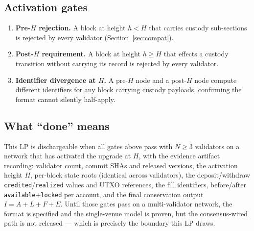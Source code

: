 \subsection{Activation gates}

\begin{enumerate}[leftmargin=2em,nosep]
\item \textbf{Pre-$H$ rejection.} A block at height $h < H$ that carries
  custody sub-sections is rejected by every validator
  (Section~\ref{sec:compat}).
\item \textbf{Post-$H$ requirement.} A block at height $h \ge H$ that
  effects a custody transition without carrying its record is rejected
  by every validator.
\item \textbf{Identifier divergence at $H$.} A pre-$H$ node and a
  post-$H$ node compute different identifiers for any block carrying
  custody payloads, confirming the format cannot silently half-apply.
\end{enumerate}

\subsection{What ``done'' means}

This LP is dischargeable when all gates above pass with $N \ge 3$
validators on a network that has activated the upgrade at $H$, with the
evidence artifact recording: validator count, commit SHAs and released
versions, the activation height $H$, per-block state roots (identical
across validators), the deposit/withdraw \texttt{credited}/\texttt{realized}
values and UTXO references, the fill identifiers, before/after
\texttt{available}+\texttt{locked} per account, and the final
conservation output $I = A + L + F + E$. Until those gates pass on a
multi-validator network, the format is specified and the single-venue
model is proven, but the consensus-wired path is not released --- which
is precisely the boundary this LP draws.
